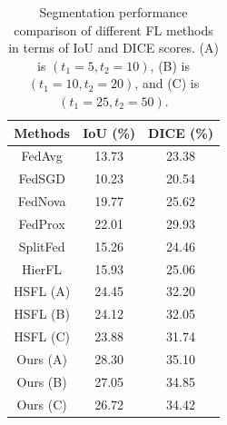 \documentclass[letterpaper]{article} %
\begin{document}
        \begin{table}
            \centering
            \begin{tabular}{c|c|c}
                \hline
                \textbf{Methods} & \textbf{IoU (\%)} & \textbf{DICE (\%)} \\ \hline
                FedAvg    & 13.73  & 23.38 \\ 
                FedSGD    & 10.23  & 20.54 \\ 
                FedNova   & 19.77  & 25.62 \\ 
                FedProx   & 22.01  & 29.93 \\ \hline
                SplitFed  & 15.26  & 24.46 \\ \hline
                HierFL    & 15.93  & 25.06 \\ \hline
                HSFL (A)  & 24.45 & 32.20 \\
                HSFL (B)   & 24.12 & 32.05 \\
                HSFL (C)     & 23.88 & 31.74 \\ \hline
                Ours (A)  & 28.30 & 35.10 \\
                Ours (B)   & 27.05 & 34.85 \\
                Ours (C)     & 26.72 & 34.42 \\ \hline
            \end{tabular}
            \caption{Segmentation performance comparison of different FL methods in terms of IoU and DICE scores. (A) is $(t_1=5, t_2=10)$, (B) is $(t_1=10, t_2=20)$, and (C) is $(t_1=25, t_2=50)$.}
            \label{tab:sgmentation}
        \end{table}
\end{document}
